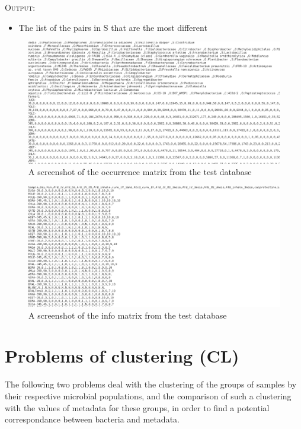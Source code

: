 \documentclass{report}
\begin{document}
\bigskip

\textsc{Output:} \begin{itemize}
                 \item The list of the pairs in \textsc{S} that are the most different
                 \end{itemize}

\begin{figure}[H]
\centering
\includegraphics[scale=0.3]{illustrations/occmatrix.png} 
\caption{A screenshot of the occurrence matrix from the test database}
\end{figure}

\begin{figure}[H]
\centering
\includegraphics[scale=0.3]{illustrations/infomatrix.png}
\caption{A screenshot of the info matrix from the test database}
\end{figure}

\section{Problems of clustering (CL)}

The following two problems deal with the clustering of the groups of samples by their respective microbial populations, and the comparison of such a clustering with the values of metadata for these groups, in order to find a potential correspondance between bacteria and metadata. 
\end{document}
